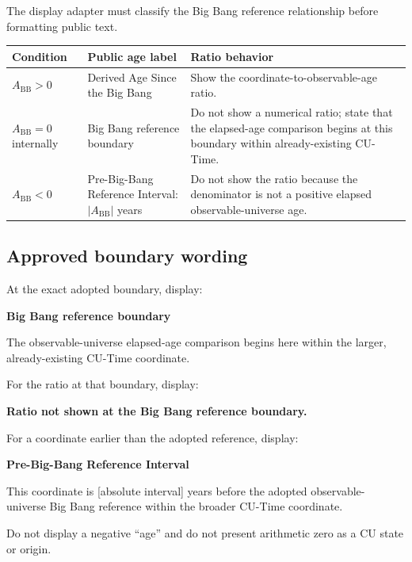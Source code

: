 \documentclass[11pt,letterpaper]{article}
\begin{document}
The display adapter must classify the Big Bang reference relationship before
formatting public text.

\begin{longtable}{L{1.25in}L{2.05in}L{2.85in}}
\toprule
\textbf{Condition} & \textbf{Public age label} & \textbf{Ratio behavior} \\
\midrule
\(A_{\mathrm{BB}}>0\) & Derived Age Since the Big Bang & Show the coordinate-to-observable-age ratio. \\
\(A_{\mathrm{BB}}=0\) internally & Big Bang reference boundary & Do not show a numerical ratio; state that the elapsed-age comparison begins at this boundary within already-existing CU-Time. \\
\(A_{\mathrm{BB}}<0\) & Pre-Big-Bang Reference Interval: \(|A_{\mathrm{BB}}|\) years & Do not show the ratio because the denominator is not a positive elapsed observable-universe age. \\
\bottomrule
\end{longtable}

\subsection{Approved boundary wording}

At the exact adopted boundary, display:

\begin{notebox}
\textbf{Big Bang reference boundary}\par
The observable-universe elapsed-age comparison begins here within the larger,
already-existing CU-Time coordinate.
\end{notebox}

For the ratio at that boundary, display:

\begin{notebox}
\textbf{Ratio not shown at the Big Bang reference boundary.}
\end{notebox}

For a coordinate earlier than the adopted reference, display:

\begin{notebox}
\textbf{Pre-Big-Bang Reference Interval}\par
This coordinate is [absolute interval] years before the adopted observable-
universe Big Bang reference within the broader CU-Time coordinate.
\end{notebox}

Do not display a negative ``age'' and do not present arithmetic zero as a CU
state or origin.
\end{document}
